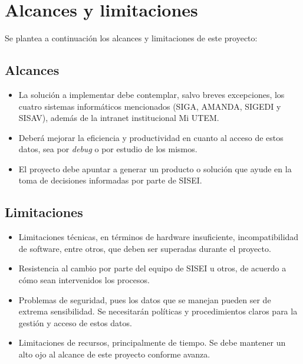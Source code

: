 \section{Alcances y limitaciones}

Se plantea a continuación los alcances y limitaciones de este proyecto:

\subsection{Alcances}

\begin{itemize}
	\item La solución a implementar debe contemplar, salvo breves excepciones, los cuatro sistemas informáticos mencionados (SIGA, AMANDA, SIGEDI y SISAV), además de la intranet institucional Mi UTEM.
	\item Deberá mejorar la eficiencia y productividad en cuanto al acceso de estos datos, sea por \textit{debug} o por estudio de los mismos.
	\item El proyecto debe apuntar a generar un producto o solución que ayude en la toma de decisiones informadas por parte de SISEI.
\end{itemize}

\subsection{Limitaciones}
\begin{itemize}
	\item Limitaciones técnicas, en términos de hardware insuficiente, incompatibilidad de software, entre otros, que deben ser superadas durante el proyecto.
	\item Resistencia al cambio por parte del equipo de SISEI u otros, de acuerdo a cómo sean intervenidos los procesos.
	\item Problemas de seguridad, pues los datos que se manejan pueden ser de extrema sensibilidad. Se necesitarán políticas y procedimientos claros para la gestión y acceso de estos datos.
	\item Limitaciones de recursos, principalmente de tiempo. Se debe mantener un alto ojo al alcance de este proyecto conforme avanza.
\end{itemize}
